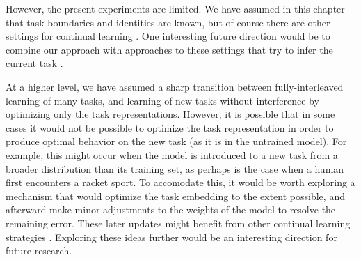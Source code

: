 However, the present experiments are limited. We have assumed in this chapter that task boundaries and identities are known, but of course there are other settings for continual learning \citep{Ven2018}. One interesting future direction would be to combine our approach with approaches to these settings that try to infer the current task \citep[e.g][]{Nagabandi2019}. \par
At a higher level, we have assumed a sharp transition between fully-interleaved learning of many tasks, and learning of new tasks without interference by optimizing only the task representations. However, it is possible that in some cases it would not be possible to optimize the task representation in order to produce optimal behavior on the new task (as it is in the untrained model). For example, this might occur when the model is introduced to a new task from a broader distribution than its training set, as perhaps is the case when a human first encounters a racket sport. To accomodate this, it would be worth exploring a mechanism that would optimize the task embedding to the extent possible, and afterward make minor adjustments to the weights of the model to resolve the remaining error. These later updates might benefit from other continual learning strategies \citep[e.g.][]{Kirkpatrick2016, Zenke2017}. Exploring these ideas further would be an interesting direction for future research.\par
